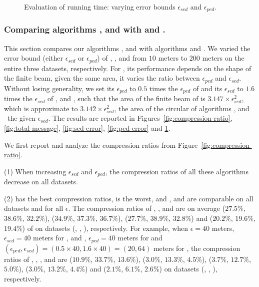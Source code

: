 {\begin{figure}[tb!]
	\vspace{-1ex}
	\caption{\small Evaluation of running time: varying error bounds $\epsilon_{sed}$ and $\epsilon_{ped}$.}
	\label{fig:running-time}
	\vspace{-1ex}
\end{figure}


\subsubsection{Comparing algorithms \bitt, \sitt and \citt with \ldrh and \grts.}
This section compares our algorithms \citt, \sitt and \bitt with algorithms \ldrh and \grts.
We varied the error bound (either $\epsilon_{sed}$ or $\epsilon_{ped}$) of \citt, \sitt, \ldrh and \grts from $10$ meters to $200$ meters on the entire three datasets, respectively. 
{For \bitt, its performance depends on the shape of the finite beam, \ie given the same area, it varies \wrt the ratio between $\epsilon_{ped}$ and $\epsilon_{sed}$. {Without losing generality}, we set its $\epsilon_{ped}$ to {$0.5$} times the $\epsilon_{ped}$ of \sitt and its $\epsilon_{sed}$ to {$1.6$} times the $\epsilon_{sed}$ of \citt, \grts and \ldrh, such that the area of the finite beam of \bitt is $3.147\times\epsilon_{sed}^2$, which is approximate to $3.142\times\epsilon_{sed}^2$, the area of the circular of algorithms \citt, \ldrh and \grts~\wrt the given $\epsilon_{sed}$.}
%
The results are reported in Figures~\ref{fig:compression-ratio}, \ref{fig:total-message}, \ref{fig:sed-error}, \ref{fig:ped-error} and \ref{fig:running-time}.


 We first report and analyze the compression ratios from Figure~\ref{fig:compression-ratio}.

\ni (1) When increasing $\epsilon_{sed}$ and $\epsilon_{ped}$, the compression ratios of all these algorithms decrease on all datasets.

\ni (2) \sitt has the best compression ratios, \ldrh is the worst, and \grts, \citt and \bitt are comparable on all datasets and for all $\epsilon$.
The compression ratios of \grts, \bitt,  \citt and \sitt are on average {($27.5\%$, $38.6\%$, $32.2\%$), ($34.9\%$, $37.3\%$, $36.7\%$), ($27.7\%$, $38.9\%$, $32.8\%$) and ($20.2\%$, $19.6\%$, $19.4\%$)} of \ldrh on datasets (\mopsi, \sercar, \geolife), respectively.
For example, when $\epsilon = 40$ meters, \ie~$\epsilon_{sed} = 40$ meters for \ldrh, \grts and \citt, $\epsilon_{ped} = 40$ meters for \sitt and {$(\epsilon_{ped}, \epsilon_{sed}) = (0.5\times 40, 1.6\times 40)=(20, 64)$} meters for \bitt, the compression ratios of \ldrh, \grts, \bitt, \citt and \sitt are
{($10.9\%$, $33.7\%$, $13.6\%$), ($3.0\%$, $13.3\%$, $4.5\%$), {($3.7\%$, $12.7\%$, $5.0\%$)}, ($3.0\%$, $13.2\%$, $4.4\%$) and ($2.1\%$, $6.1\%$, $2.6\%$)} on  {datasets (\mopsi, \sercar, \geolife)}, respectively. 

}

